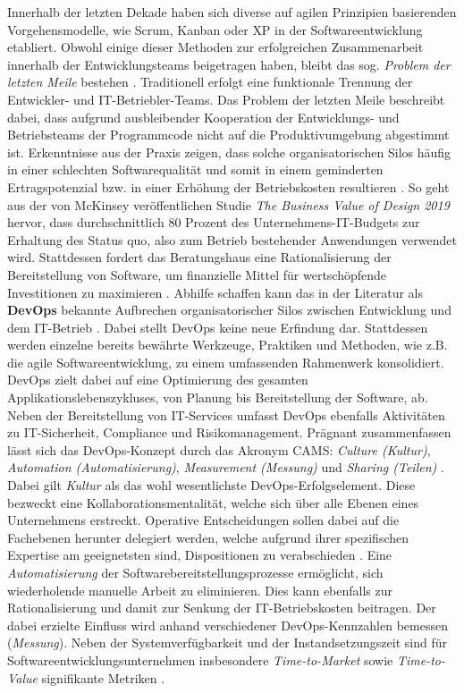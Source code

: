 Innerhalb der letzten Dekade haben sich diverse auf agilen Prinzipien basierenden Vorgehensmodelle, wie Scrum, Kanban oder \ac{XP} in der Softwareentwicklung etabliert. Obwohl einige dieser Methoden zur erfolgreichen Zusammenarbeit innerhalb der Entwicklungsteams beigetragen haben, bleibt das sog.  \textit{Problem der letzten Meile} bestehen \cite{Qentelli.20230305}. Traditionell erfolgt eine funktionale Trennung der Entwickler- und IT-Betriebler-Teams. Das Problem der letzten Meile beschreibt dabei, dass aufgrund ausbleibender Kooperation der Entwicklungs- und Betriebsteams der Programmcode nicht auf die Produktivumgebung abgestimmt ist. Erkenntnisse aus der Praxis zeigen, dass solche organisatorischen Silos häufig in einer schlechten Softwarequalität und somit in einem geminderten Ertragspotenzial bzw. in einer Erhöhung der Betriebskosten resultieren \cite[1]{Halstenberg.2020}. So geht aus der von McKinsey veröffentlichen Studie \textit{The Business Value of Design 2019} hervor, dass durchschnittlich 80 Prozent des Unternehmens-IT-Budgets zur Erhaltung des Status quo, also zum Betrieb bestehender Anwendungen verwendet wird. Stattdessen fordert das Beratungshaus eine Rationalisierung der Bereitstellung von Software, um finanzielle Mittel für wertschöpfende Investitionen zu maximieren \cite{.20230305}. Abhilfe schaffen kann das in der Literatur als \textbf{\ac{DevOps}} bekannte Aufbrechen organisatorischer Silos zwischen Entwicklung und dem IT-Betrieb \cite[1]{Halstenberg.2020}. 
Dabei stellt DevOps keine neue Erfindung dar. Stattdessen werden einzelne bereits bewährte Werkzeuge, Praktiken und Methoden, wie z.B. die agile Softwareentwicklung, zu einem umfassenden Rahmenwerk konsolidiert. DevOps zielt dabei auf eine Optimierung des gesamten Applikationslebenszykluses, von Planung bis Bereitstellung der Software, ab. Neben der Bereitstellung von IT-Services umfasst DevOps ebenfalls Aktivitäten zu IT-Sicherheit, Compliance und Risikomanagement. Prägnant zusammenfassen lässt sich das DevOps-Konzept durch das Akronym CAMS: \textit{Culture (Kultur)}, \textit{Automation (Automatisierung)}, \textit{Measurement (Messung)} und \textit{Sharing (Teilen)} \cite[5]{Halstenberg.2020}. Dabei gilt \textit{Kultur} als das wohl wesentlichste DevOps-Erfolgselement. Diese bezweckt eine Kollaborationsmentalität, welche sich über alle Ebenen eines Unternehmens erstreckt. Operative Entscheidungen sollen dabei auf die Fachebenen herunter delegiert werden, welche aufgrund ihrer spezifischen Expertise am geeignetsten sind, Dispositionen zu verabschieden \cite[5]{Halstenberg.2020}. Eine \textit{Automatisierung} der Softwarebereitstellungsprozesse ermöglicht, sich wiederholende manuelle Arbeit zu eliminieren. Dies kann ebenfalls zur Rationalisierung und damit zur Senkung der IT-Betriebskosten beitragen. Der dabei erzielte Einfluss wird anhand verschiedener DevOps-Kennzahlen bemessen (\textit{Messung}). Neben der Systemverfügbarkeit und der Instandsetzungszeit sind für Softwareentwicklungsunternehmen insbesondere \textit{Time-to-Market} sowie \textit{Time-to-Value} signifikante Metriken \cite[7]{Halstenberg.2020}. 
